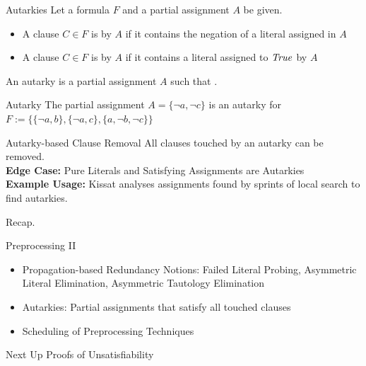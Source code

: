 \documentclass[t]{sdqbeamer}
\begin{document}
\begin{frame}{Autarkies}
Let a formula $F$ and a partial assignment $A$ be given.\\[1ex]
\begin{itemize}\setlength{\itemsep}{1ex}
    \item A clause $C \in F$ is  by $A$ if it contains the negation of a literal assigned in $A$
    \item A clause $C \in F$ is  by $A$ if it contains a literal assigned to $\mathit{True}$ by $A$
\end{itemize}
An autarky is a partial assignment $A$ such that .
\begin{exampleblock}{Autarky}
The partial assignment $A = \{ \lnot a, \lnot c \}$ is an autarky for $F := \bigl\{\{ \lnot a, b \}, \{ \lnot a, c \}, \{ a, \lnot b, \lnot c \}\bigr\}$
\end{exampleblock}
\begin{block}{Autarky-based Clause Removal}
All clauses touched by an autarky can be removed.\\[1ex]
\textbf{Edge Case:} Pure Literals and Satisfying Assignments are Autarkies\\[1ex]
\textbf{Example Usage:} Kissat analyses assignments found by sprints of local search to find autarkies.
\end{block}
\end{frame}


\begin{frame}{Recap.}
\begin{block}{Preprocessing II}
    \begin{itemize}\setlength{\itemsep}{1em}
        \item Propagation-based Redundancy Notions: Failed Literal Probing, Asymmetric Literal Elimination, Asymmetric Tautology Elimination
        \item Autarkies: Partial assignments that satisfy all touched clauses
        \item Scheduling of Preprocessing Techniques
    \end{itemize}
\end{block}
\begin{block}{Next Up}
    Proofs of Unsatisfiability
\end{block}
\end{frame}
\end{document}
